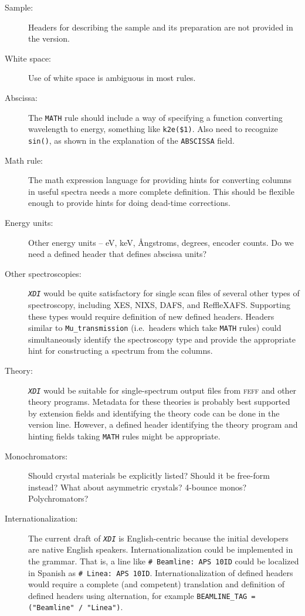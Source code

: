 \documentclass{article}
\newcommand{\sltt}[1]{\texttt{\textsl{#1}}}
\newcommand{\xdi}{\sltt{XDI}}
\begin{document}
\begin{description}
\item[Sample:] Headers for describing the sample and its preparation
  are not provided in the version.
\item[White space:] Use of white space is ambiguous in most rules.
\item[Abscissa:] The \texttt{MATH} rule should include a way of
  specifying a function converting wavelength to energy, something
  like \texttt{k2e(\$1)}.  Also need to recognize \texttt{sin()}, as
  shown in the explanation of the \texttt{ABSCISSA}
  field.\label{anchor:math}
\item[Math rule:] The math expression language for providing hints for
  converting columns in useful spectra needs a more complete
  definition.  This should be flexible enough to provide hints for
  doing dead-time corrections.
\item[Energy units:] Other energy units -- eV, keV, {\AA}ngstroms,
  degrees, encoder counts.  Do we need a defined header that defines
  abscissa units?\label{anchor:units}
\item[Other spectroscopies:] {\xdi} would be quite satisfactory for
  single scan files of several other types of spectroscopy, including
  XES, NIXS, DAFS, and ReffleXAFS.  Supporting these types would
  require definition of new defined headers.  Headers similar to
  \texttt{Mu\_transmission} (i.e.\ headers which take \texttt{MATH}
  rules) could simultaneously identify the spectroscopy type and
  provide the appropriate hint for constructing a spectrum from the
  columns.
\item[Theory:] {\xdi} would be suitable for single-spectrum output
  files from \textsc{feff} and other theory programs.  Metadata for
  these theories is probably best supported by extension fields and
  identifying the theory code can be done in the version line.
  However, a defined header identifying the theory program and hinting
  fields taking \texttt{MATH} rules might be appropriate.
\item[Monochromators:] Should crystal materials be explicitly listed?
  Should it be free-form instead?  What about asymmetric crystals?
  4-bounce monos?  Polychromators?\label{anchor:mono}
\item[Internationalization:] The current draft of {\xdi} is
  English-centric because the initial developers are native English
  speakers.  Internationalization could be implemented in the grammar.
  That is, a line like \texttt{\# Beamline:\ APS 10ID} could be
  localized in Spanish as \texttt{\# Linea:\ APS 10ID}.
  Internationalization of defined headers would require a complete
  (and competent) translation and definition of defined headers using
  alternation, for example \texttt{BEAMLINE\_TAG = ("Beamline" / "Linea")}.


\end{description}
\end{document}
